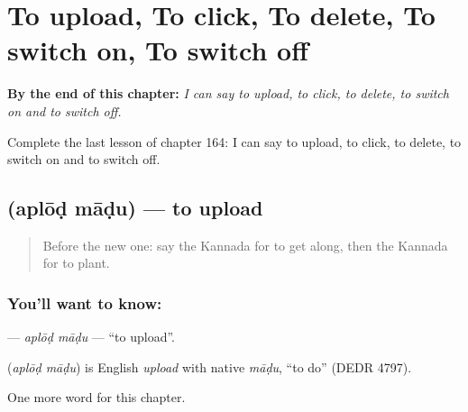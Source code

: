 
\chapter{To upload, To click, To delete, To switch on, To switch off}
\label{ch:ka-to-upload-to-click-to-delete-to-switch-on-to-switch-off}

\begin{chapteropening}
\textbf{By the end of this chapter:} \emph{I can say to upload, to click, to delete, to switch on and to switch off.}

Complete the last lesson of chapter 164: I can say to upload, to click, to delete, to switch on and to switch off.
\end{chapteropening}

\section[\texorpdfstring{\kn{ಅಪ್ಲೋಡ್} \kn{ಮಾಡು} (aplōḍ māḍu)}{ಅಪ್ಲೋಡ್ ಮಾಡು (aplōḍ māḍu)}]{  (aplōḍ māḍu) — to upload}

\label{lesson:KA-C164-aplod-madu}



\begin{quote}
Before the new one: say the Kannada for to get along, then the Kannada for to plant.
\end{quote}

\subsection*{You'll want to know:  }
\textbf{ } — \emph{aplōḍ māḍu} — \textquotedblleft{}to upload\textquotedblright{}.

\begin{cousinweb}
\textbf{ } (\emph{aplōḍ māḍu}) is English \emph{upload} with native \emph{māḍu}, \textquotedblleft{}to do\textquotedblright{} (DEDR 4797).
\end{cousinweb}

\begin{grammarlens}[title={What you've built}]
One more word for this chapter.
\end{grammarlens}

